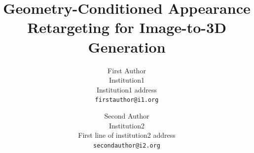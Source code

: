 \documentclass[10pt,twocolumn,letterpaper]{article}
\title{
Geometry-Conditioned Appearance Retargeting for Image-to-3D Generation
}
\author{First Author\\
Institution1\\
Institution1 address\\
{\tt\small firstauthor@i1.org}
\and
Second Author\\
Institution2\\
First line of institution2 address\\
{\tt\small secondauthor@i2.org}
}
\begin{document}
\maketitle




















\clearpage
\twocolumn
{
    \small
    
    
}


\end{document}
